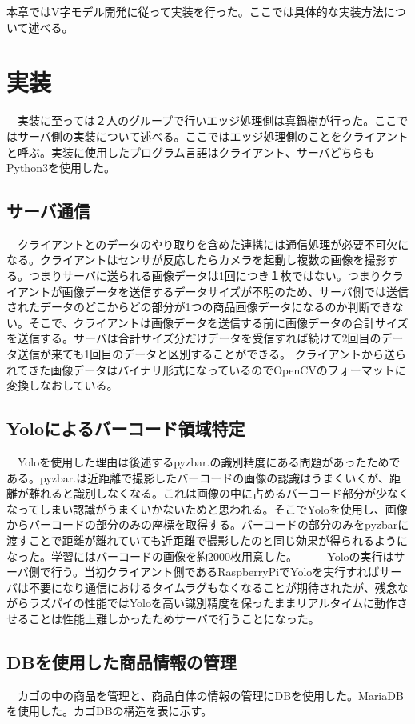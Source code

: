 本章ではV字モデル開発に従って実装を行った。ここでは具体的な実装方法について述べる。
\section{実装}
　実装に至っては２人のグループで行いエッジ処理側は真鍋樹が行った。ここではサーバ側の実装について述べる。ここではエッジ処理側のことをクライアントと呼ぶ。実装に使用したプログラム言語はクライアント、サーバどちらもPython3を使用した。

\subsection*{サーバ通信}
　クライアントとのデータのやり取りを含めた連携には通信処理が必要不可欠になる。クライアントはセンサが反応したらカメラを起動し複数の画像を撮影する。つまりサーバに送られる画像データは1回につき１枚ではない。つまりクライアントが画像データを送信するデータサイズが不明のため、サーバ側では送信されたデータのどこからどの部分が1つの商品画像データになるのか判断できない。そこで、クライアントは画像データを送信する前に画像データの合計サイズを送信する。サーバは合計サイズ分だけデータを受信すれば続けて2回目のデータ送信が来ても1回目のデータと区別することができる。
クライアントから送られてきた画像データはバイナリ形式になっているのでOpenCVのフォーマットに変換しなおしている。

\subsection*{Yoloによるバーコード領域特定}
　Yoloを使用した理由は後述するpyzbar\cite{pyzbar}.の識別精度にある問題があったためである。pyzbar\cite{pyzbar}.は近距離で撮影したバーコードの画像の認識はうまくいくが、距離が離れると識別しなくなる。これは画像の中に占めるバーコード部分が少なくなってしまい認識がうまくいかないためと思われる。そこでYoloを使用し、画像からバーコードの部分のみの座標を取得する。バーコードの部分のみをpyzbarに渡すことで距離が離れていても近距離で撮影したのと同じ効果が得られるようになった。学習にはバーコードの画像を約2000枚用意した。
　
　Yoloの実行はサーバ側で行う。当初クライアント側であるRaspberryPiでYoloを実行すればサーバは不要になり通信におけるタイムラグもなくなることが期待されたが、残念ながらラズパイの性能ではYoloを高い識別精度を保ったままリアルタイムに動作させることは性能上難しかったためサーバで行うことになった。

\subsection*{DBを使用した商品情報の管理}
　カゴの中の商品を管理と、商品自体の情報の管理にDBを使用した。MariaDBを使用した。カゴDBの構造を表に示す。

